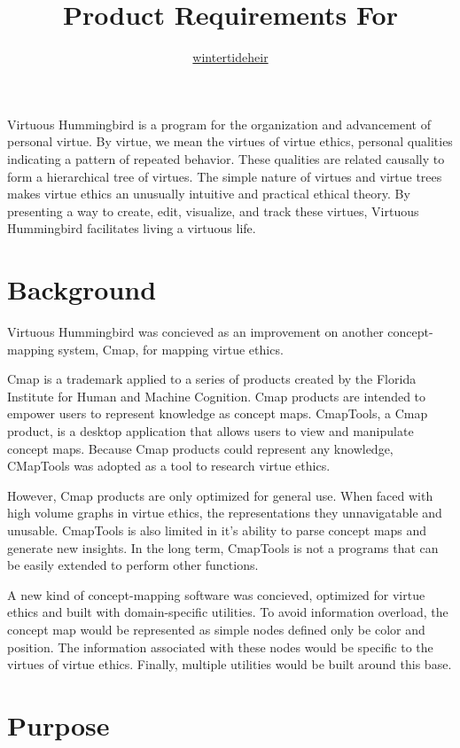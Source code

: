 \documentclass{article}
\title{Product Requirements For \name{}}
\author{\href{https://github.com/wintertideheir}{wintertideheir}}
\newcommand{\name}{Virtuous Hummingbird}
\begin{document}
\maketitle

\name{} is a program for the organization and advancement of personal virtue.
By virtue, we mean the virtues of virtue ethics, personal qualities indicating a pattern of repeated behavior.
These qualities are related causally to form a hierarchical tree of virtues. 
The simple nature of virtues and virtue trees makes virtue ethics an unusually intuitive and practical ethical theory.
By presenting a way to create, edit, visualize, and track these virtues, \name{} facilitates living a virtuous life.

\tableofcontents

\section{Background}

\name{} was concieved as an improvement on another concept-mapping system, Cmap, for mapping virtue ethics.

Cmap is a trademark applied to a series of products created by the Florida Institute for Human and Machine Cognition.
Cmap products are intended to empower users to represent knowledge as concept maps.
CmapTools, a Cmap product, is a desktop application that allows users to view and manipulate concept maps.
Because Cmap products could represent any knowledge, CMapTools was adopted as a tool to research virtue ethics.

However, Cmap products are only optimized for general use.
When faced with high volume graphs in virtue ethics, the representations they unnavigatable and unusable.
CmapTools is also limited in it's ability to parse concept maps and generate new insights.
In the long term, CmapTools is not a programs that can be easily extended to perform other functions.

A new kind of concept-mapping software was concieved, optimized for virtue ethics and built with domain-specific utilities.
To avoid information overload, the concept map would be represented as simple nodes defined only be color and position.
The information associated with these nodes would be specific to the virtues of virtue ethics.
Finally, multiple utilities would be built around this base.

\section{Purpose}
\end{document}
